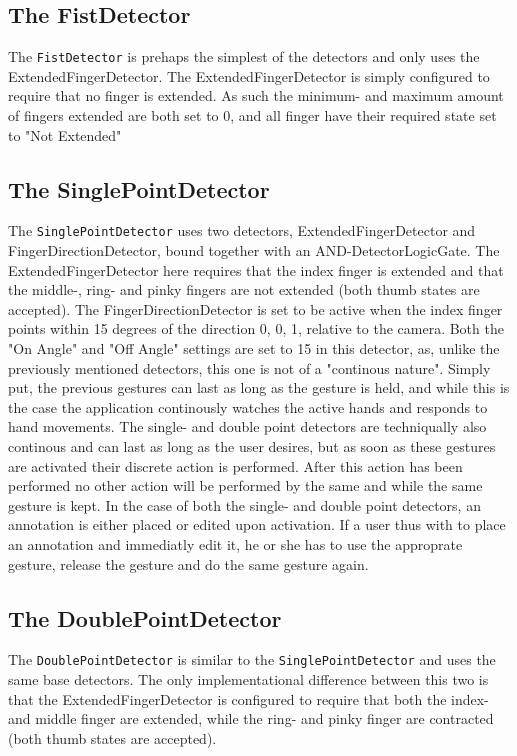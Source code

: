 \subsection{The FistDetector}
The \texttt{FistDetector} is prehaps the simplest of the detectors and only uses the ExtendedFingerDetector.
The ExtendedFingerDetector is simply configured to require that no finger is extended. 
As such the minimum- and maximum amount of fingers extended are both set to 0, and all finger have their required state set to "Not Extended"

\subsection{The SinglePointDetector}
The \texttt{SinglePointDetector} uses two detectors, ExtendedFingerDetector and FingerDirectionDetector, bound together with an AND-DetectorLogicGate.
The ExtendedFingerDetector here requires that the index finger is extended and that the middle-, ring- and pinky fingers are not extended (both thumb states are accepted).
The FingerDirectionDetector is set to be active when the index finger points within 15 degrees of the direction {0, 0, 1}, relative to the camera.
Both the "On Angle" and "Off Angle" settings are set to 15 in this detector, as, unlike the previously mentioned detectors, this one is not of a "continous nature".
Simply put, the previous gestures can last as long as the gesture is held, and while this is the case the application continously watches the active hands and responds to
hand movements. The single- and double point detectors are techniqually also continous and can last as long as the user desires, 
but as soon as these gestures are activated their discrete action is performed. After this action has been performed no other action will be performed by the same
and while the same gesture is kept. In the case of both the single- and double point detectors, an annotation is either placed or edited upon activation. 
If a user thus with to place an annotation and immediatly edit it, he or she has to use the approprate gesture, release the gesture and do the same gesture again.

\subsection{The DoublePointDetector}
The \texttt{DoublePointDetector} is similar to the \texttt{SinglePointDetector} and uses the same base detectors. 
The only implementational difference between this two is that the ExtendedFingerDetector is configured to require that both the index- and middle finger are extended, while
the ring- and pinky finger are contracted (both thumb states are accepted).


